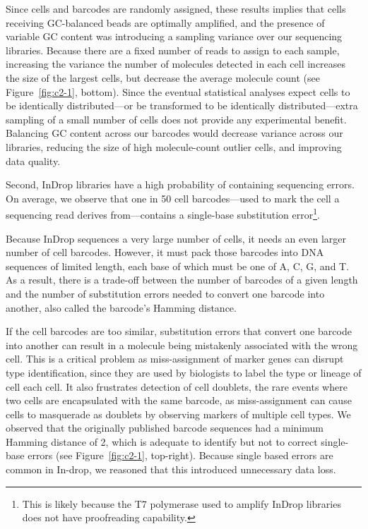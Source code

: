 Since cells and barcodes are randomly assigned, these results implies that cells receiving GC-balanced beads are optimally amplified, and the presence of variable GC content was introducing a sampling variance over our sequencing libraries.
Because there are a fixed number of reads to assign to each sample, increasing the variance the number of molecules detected in each cell increases the size of the largest cells, but decrease the average molecule count (see Figure~\ref{fig:c2-1}, bottom).
Since the eventual statistical analyses expect cells to be identically distributed---or be transformed to be identically distributed---extra sampling of a small number of cells does not provide any experimental benefit. 
Balancing GC content across our barcodes would decrease variance across our libraries, reducing the size of high molecule-count outlier cells, and improving data quality. 

Second, InDrop libraries have a high probability of containing sequencing errors. 
On average, we observe that one in 50 cell barcodes---used to mark the cell a sequencing read derives from---contains a single-base substitution error\footnote{This is likely because the T7 polymerase used to amplify InDrop libraries does not have proofreading capability.}. 

Because InDrop sequences a very large number of cells, it needs an even larger number of cell barcodes. 
However, it must pack those barcodes into DNA sequences of limited length, each base of which must be one of A, C, G, and T. 
As a result, there is a trade-off between the number of barcodes of a given length and the number of substitution errors needed to convert one barcode into another, also called the barcode's Hamming distance. 

If the cell barcodes are too similar, substitution errors that convert one barcode into another can result in a molecule being mistakenly associated with the wrong cell. 
This is a critical problem as miss-assignment of marker genes can disrupt type identification, since they are used by biologists to label the type or lineage of cell each cell. 
It also frustrates detection of cell doublets, the rare events where two cells are encapsulated with the same barcode, as miss-assignment can cause cells to masquerade as doublets by observing markers of multiple cell types.  
We observed that the originally published barcode sequences had a minimum Hamming distance of 2, which is adequate to identify but not to correct single-base errors (see Figure~\ref{fig:c2-1}, top-right).  
Because single based errors are common in In-drop, we reasoned that this introduced unnecessary data loss.

